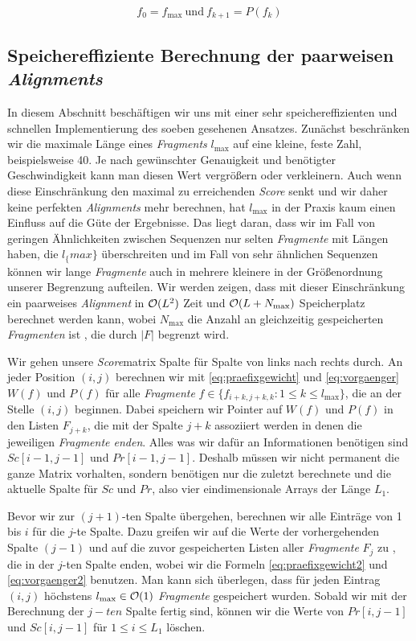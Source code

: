 \begin{equation}\label{eq:backtracking}
	f_0 = f_{\max}\: \text{und}\: f_{k+1} = P(f_k)
\end{equation} 

\subsection{Speichereffiziente Berechnung der paarweisen \emph{Alignments}}

In diesem Abschnitt beschäftigen wir uns mit einer sehr speichereffizienten und schnellen Implementierung des soeben gesehenen Ansatzes. Zunächst beschränken wir die maximale Länge eines \emph{Fragments} $l_{\max}$ auf eine kleine, feste Zahl, beispielsweise 40. Je nach gewünschter Genauigkeit und benötigter Geschwindigkeit kann man diesen Wert vergrößern oder verkleinern. Auch wenn diese Einschränkung den maximal zu erreichenden \emph{Score} senkt und wir daher keine perfekten \emph{Alignments} mehr berechnen, hat $l_{\max}$ in der Praxis kaum einen Einfluss auf die Güte der Ergebnisse. Das liegt daran, dass wir im Fall von geringen Ähnlichkeiten zwischen Sequenzen nur selten \emph{Fragmente} mit Längen haben, die $l_\{max\}$ überschreiten und im Fall von sehr ähnlichen Sequenzen können wir lange \emph{Fragmente} auch in mehrere kleinere in der Größenordnung unserer Begrenzung aufteilen. Wir werden zeigen, dass mit dieser Einschränkung ein paarweises \emph{Alignment} in $\mathcal{O}(L^2)$ Zeit und $\mathcal{O}(L+N_{\max})$ Speicherplatz berechnet werden kann, wobei $N_{\max}$ die Anzahl an gleichzeitig gespeicherten \emph{Fragmenten} ist \citep{m02}, die durch $|F|$ begrenzt wird.

Wir gehen unsere \emph{Score}matrix Spalte für Spalte von links nach rechts durch. An jeder Position $(i,j)$ berechnen wir mit \ref{eq:praefixgewicht} und \ref{eq:vorgaenger} $W(f)$ und $P(f)$ für alle \emph{Fragmente }$f \in \{f_{i+k,j+k,k} : 1 \leq k \leq l_{\max}\}$, die an der Stelle $(i,j)$ beginnen. Dabei speichern wir Pointer auf $W(f)$ und $P(f)$ in den Listen $F_{j+k}$, die mit der Spalte $j+k$ assoziiert werden in denen die jeweiligen \emph{Fragmente enden}. Alles was wir dafür an Informationen benötigen sind $Sc[i\!-\!1,j\!-\!1]$ und $Pr[i\!-\!1,j\!-\!1]$. Deshalb müssen wir nicht permanent die ganze Matrix vorhalten, sondern benötigen nur die zuletzt berechnete und die aktuelle Spalte für $Sc$ und $Pr$, also vier eindimensionale Arrays der Länge $L_1$.

Bevor wir zur $(j+1)$-ten Spalte übergehen, berechnen wir alle Einträge von 1 bis $i$ für die $j$-te Spalte. Dazu greifen wir auf die Werte der vorhergehenden Spalte $(j-1)$ und auf die zuvor gespeicherten Listen aller \emph{Fragmente} $F_j$ zu , die in der $j$-ten Spalte enden, wobei wir die Formeln \ref{eq:praefixgewicht2} und \ref{eq:vorgaenger2} benutzen. Man kann sich überlegen, dass für jeden Eintrag $(i,j)$ höchstens $l_{\max} \in \mathcal{O}(1)$ \emph{Fragmente} gespeichert wurden. Sobald wir mit der Berechnung der $j-ten$ Spalte fertig sind, können wir die Werte von $Pr[i,j-1]$ und $Sc[i,j-1]$ für $1 \leq i \leq L_1$ löschen.


